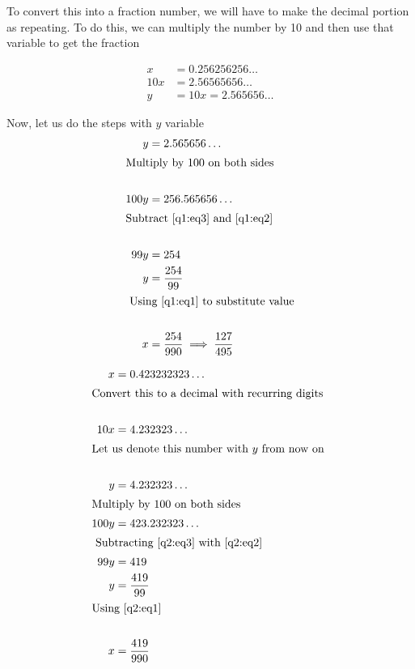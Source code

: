 To convert this into a fraction number, we will have to make the decimal portion as repeating. To do this, we can multiply the number by 10 and then use that variable to get the fraction

\begin{align}
    x &= 0.256256256\dots \nonumber \\
    10x &= 2.56565656\dots \nonumber \\
    y &= 10x = 2.565656\dots        \label{q1:eq1}
\end{align}

Now, let us do the steps with $y$ variable
\begin{align}
    y &= 2.565656\dots              \label{q1:eq2} \\
    \shortintertext{Multiply by 100 on both sides} \nonumber \\
    100y &= 256.565656\dots          \label{q1:eq3} \\
    \shortintertext{Subtract \eqref{q1:eq3} and \eqref{q1:eq2} } \nonumber \\
    99y &= 254 \nonumber \\
    y &= \displaystyle{ \frac{254}{99} } \nonumber \\
    \shortintertext{ Using \eqref{q1:eq1} to substitute value} \nonumber \\
    x &= \displaystyle{ \frac{254}{990} \implies \frac{127}{495} } \nonumber    
\end{align}


\begin{align}
x &= 0.423232323\dots \nonumber \\
\shortintertext{Convert this to a decimal with recurring digits} \nonumber \\
10x &= 4.232323\dots \label{q2:eq1} \\
\shortintertext{Let us denote this number with $y$ from now on } \nonumber \\
y &= 4.232323\dots \label{q2:eq2} \\
\shortintertext{Multiply by 100 on both sides}
100y &= 423.232323\dots \label{q2:eq3} \\
\shortintertext{ Subtracting \eqref{q2:eq3} with \eqref{q2:eq2} }
99y &= 419 \nonumber \\
y &= \displaystyle{ \frac{419}{99} } \nonumber \\
\shortintertext{Using \eqref{q2:eq1}} \nonumber \\
x &= \displaystyle{ \frac{419}{990} }
\end{align}

